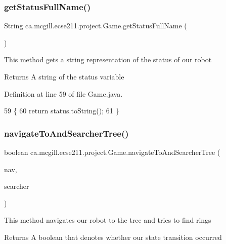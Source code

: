 \subsubsection{\texorpdfstring{get\+Status\+Full\+Name()}{getStatusFullName()}}
{\footnotesize\ttfamily String ca.\+mcgill.\+ecse211.\+project.\+Game.\+get\+Status\+Full\+Name (\begin{DoxyParamCaption}{ }\end{DoxyParamCaption})}

This method gets a string representation of the status of our robot

\begin{DoxyReturn}{Returns}
A string of the status variable 
\end{DoxyReturn}


Definition at line 59 of file Game.\+java.


\begin{DoxyCode}
59                                     \{
60     \textcolor{keywordflow}{return} status.toString();
61   \}
\end{DoxyCode}
\mbox{\label{enumca_1_1mcgill_1_1ecse211_1_1project_1_1_game_a623ef585f41a45d778590392314ea352}} 
\subsubsection{\texorpdfstring{navigate\+To\+And\+Searcher\+Tree()}{navigateToAndSearcherTree()}}
{\footnotesize\ttfamily boolean ca.\+mcgill.\+ecse211.\+project.\+Game.\+navigate\+To\+And\+Searcher\+Tree (\begin{DoxyParamCaption}\item[{\hyperlink{classca_1_1mcgill_1_1ecse211_1_1project_1_1_navigation}{Navigation}}]{nav,  }\item[{\hyperlink{classca_1_1mcgill_1_1ecse211_1_1project_1_1_ring_searcher}{Ring\+Searcher}}]{searcher }\end{DoxyParamCaption})}

This method navigates our robot to the tree and tries to find rings

\begin{DoxyReturn}{Returns}
A boolean that denotes whether our state transition occurred 
\end{DoxyReturn}


